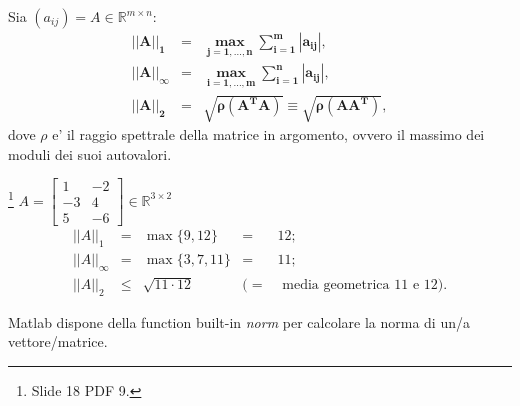 \noindent Sia $(a_{ij})=A\in\mathbb{R}^{m\times n}:$
\begin{equation*}
    \begin{matrix}
        \boldsymbol {||A||_1} &\boldsymbol=& \boldsymbol{\underset{j=1,\hdots, n}{\max}\sum_{i=1}^m|a_{ij}|},\\
        \boldsymbol {||A||_\infty} &\boldsymbol=& \boldsymbol{\underset{i=1,\hdots, m}{\max}\sum_{i=1}^n|a_{ij}|},\\
        \boldsymbol {||A||_2} &\boldsymbol{=} & \boldsymbol{\sqrt{\rho(A^T A)} \equiv \sqrt{\rho (AA^T)}},
    \end{matrix}
\end{equation*}
dove $\rho$ e' il raggio spettrale della matrice in argomento, ovvero il massimo dei moduli dei suoi autovalori.

\begin{example}\footnote{Slide 18 PDF 9.}
    $A=\begin{bmatrix}
        1 & -2\\
        -3 & 4\\
        5 & -6
    \end{bmatrix}\in\mathbb{R}^{3\times 2}$
    \begin{equation*}
        \begin{matrix}
            ||A||_1 &=& \max\{9,12\} &=& 12;\\
            ||A||_\infty &=& \max\{3,7,11\} &=& 11;\\
            ||A||_2 &\leq& \sqrt{11\cdot 12} &(=& \text{ media geometrica 11 e 12).}
        \end{matrix}
    \end{equation*}
\end{example}
\begin{remark}
    Matlab dispone della function built-in \textit{norm} per calcolare la norma di un/a vettore/matrice.
\end{remark}